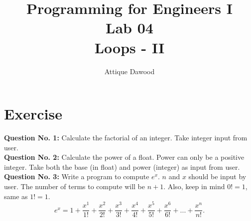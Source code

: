 \documentclass[12pt,a4paper]{article}
\title{\vspace{-2cm}Programming for Engineers I\\Lab 04\\Loops - II}
\author{Attique Dawood}
\begin{document}
\maketitle

\section{Exercise}
\textbf{Question No. 1:} Calculate the factorial of an integer. Take integer input from user.\\
\noindent\textbf{Question No. 2:} Calculate the power of a float. Power can only be a positive integer. Take both the base (in float) and power (integer) as input from user.\\
\noindent\textbf{Question No. 3:} Write a program to compute $e^x$. $n$ and $x$ should be input by user. The number of terms to compute will be $n+1$. Also, keep in mind $0! = 1$, same as $1! = 1$.
\begin{equation}
e^x = 1+\dfrac{x^1}{1!}+\dfrac{x^2}{2!}+\dfrac{x^3}{3!}+\dfrac{x^4}{4!}+\dfrac{x^5}{5!}+\dfrac{x^6}{6!}+...+\dfrac{x^n}{n!}.
\label{eq:ex-Taylor-Series}
\end{equation}
\end{document}
